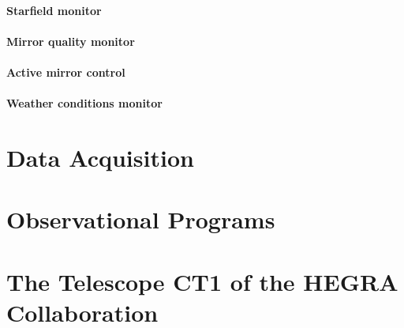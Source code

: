 \paragraph{Starfield monitor}

\paragraph{Mirror quality monitor}

\paragraph{Active mirror control}

\paragraph{Weather conditions monitor}

\section{Data Acquisition}

\section{Observational Programs}

\section{The Telescope CT1 of the HEGRA Collaboration}

\endinput
%

